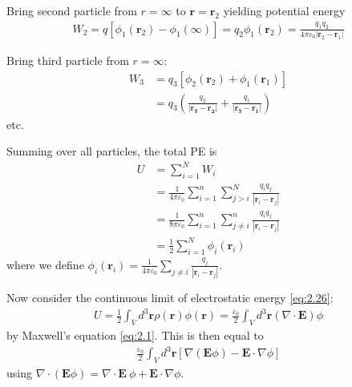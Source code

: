 \documentclass[a4paper]{article}
\begin{document}
Bring second particle from $r=\infty$ to $\mathbf{r} = \mathbf{r}_2$ yielding potential energy
\begin{equation*}
\begin{aligned}
W_2 = q[\phi_1 (\mathbf{r}_2) - \phi_1 (\infty)] = q_2 \phi_1 (\mathbf{r}_2) = \frac{q_1q_2}{4\pi \varepsilon_0 |\mathbf{r}_2 - \mathbf{r}_1|}
\end{aligned}
\end{equation*}

Bring third particle from $r=\infty$:
\begin{equation*}
\begin{aligned}
W_3 &= q_3[\phi_2 (\mathbf{r}_2) + \phi_1 (\mathbf{r}_1)]\\
&= q_3 \left(\frac{q_2}{|\mathbf{r_3}-\mathbf{r_2}|}+\frac{q_1}{|\mathbf{r_3}-\mathbf{r_1}|}\right)
\end{aligned}
\end{equation*}
etc.

Summing over all particles, the total PE is
\begin{equation*}\tag{2.26} \label{eq:2.26}
\begin{aligned}
U &= \sum_{i=1}^N W_i\\
&= \frac{1}{4\pi \varepsilon_0} \sum_{i=1}^n \sum_{j>i}^N \frac{q_i q_j}{|\mathbf{r}_i-\mathbf{r}_j|}\\
&= \frac{1}{8\pi\varepsilon_0} \sum_{i=1}^n \sum_{j \neq i}^n \frac{q_i q_j}{|\mathbf{r}_i-\mathbf{r}_j|}\\
&= \frac{1}{2} \sum_{i=1}^N \phi_i (\mathbf{r}_i)
\end{aligned}
\end{equation*}
where we define $\phi_i (\mathbf{r}_i) = \frac{1}{4\pi \varepsilon_0} \sum_{j\neq i} \frac{q_j}{|\mathbf{r}_i-\mathbf{r}_j|}$.

Now consider the continuous limit of electrostatic energy \eqref{eq:2.26}:
\begin{equation*}
\begin{aligned}
U = \frac{1}{2} \int_V d^3 \mathbf{r} \rho(\mathbf{r})\phi(\mathbf{r}) = \frac{\varepsilon_0}{2} \int_V d^3 \mathbf{r} (\nabla \cdot \mathbf{E}) \phi
\end{aligned}
\end{equation*}
by Maxwell's equation \eqref{eq:2.1}. This is then equal to
\begin{equation*}\tag{*}
\begin{aligned}
\frac{\varepsilon_0}{2} \int_V d^3 \mathbf{r} [\nabla(\mathbf{E}\phi)-\mathbf{E} \cdot \nabla \phi]
\end{aligned}
\end{equation*}
using $\nabla \cdot (\mathbf{E}\phi) = \nabla\cdot\mathbf{E} \ \phi + \mathbf{E} \cdot \nabla \phi$.
\end{document}

